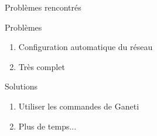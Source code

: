 

\begin{frame}{Problèmes rencontrés}
 \begin{alertblock}{Problèmes}
   \begin{enumerate}
     \item Configuration automatique du réseau
     \item Très complet
       \pause
   \end{enumerate}
 \end{alertblock}
\pause
 \begin{exampleblock}{Solutions}
   \begin{enumerate}
     \item Utiliser les commandes de Ganeti
     \item Plus de temps...
   \end{enumerate}
 \end{exampleblock}
\end{frame}



%
